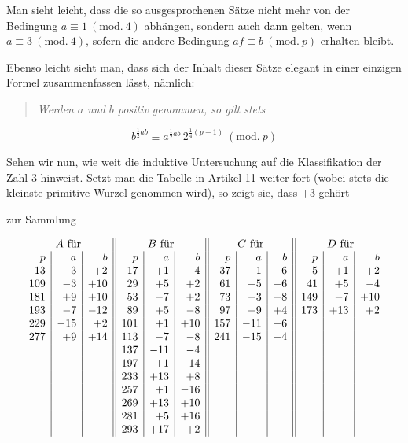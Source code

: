 Man sieht leicht, dass die so ausgesprochenen Sätze nicht mehr von der Bedingung $a\equiv1\ (\mathrm{mod.}\ 4)$ abhängen, sondern auch dann gelten, wenn $a\equiv3\ (\mathrm{mod.}\ 4)$, sofern die andere Bedingung $af\equiv b\ (\mathrm{mod.}\ p)$ erhalten bleibt.

Ebenso leicht sieht man, dass sich der Inhalt dieser Sätze elegant in einer einzigen Formel zusammenfassen lässt, nämlich:
\begin{quote}\itshape Werden $a$ und $b$ positiv genommen, so gilt stets\end{quote}
\[
b^{\frac12ab}\equiv a^{\frac12ab}\,2^{\frac14(p-1)}\ (\mathrm{mod.}\ p)
\]

Sehen wir nun, wie weit die induktive Untersuchung auf die Klassifikation der Zahl $3$ hinweist. Setzt man die Tabelle in Artikel 11 weiter fort (wobei stets die kleinste primitive Wurzel genommen wird), so zeigt sie, dass $+3$ gehört
\begin{center}zur Sammlung\end{center}
\[
\begin{array}{r|r|r||r|r|r||r|r|r||r|r|r}
\multicolumn{3}{c||}{A\ \text{für}}&\multicolumn{3}{c||}{B\ \text{für}}&\multicolumn{3}{c||}{C\ \text{für}}&\multicolumn{3}{c}{D\ \text{für}}\\
p&a&b&p&a&b&p&a&b&p&a&b\\
13&-3&+2&17&+1&-4&37&+1&-6&5&+1&+2\\
109&-3&+10&29&+5&+2&61&+5&-6&41&+5&-4\\
181&+9&+10&53&-7&+2&73&-3&-8&149&-7&+10\\
193&-7&-12&89&+5&-8&97&+9&+4&173&+13&+2\\
229&-15&+2&101&+1&+10&157&-11&-6&&&\\
277&+9&+14&113&-7&-8&241&-15&-4&&&\\
&&&137&-11&-4&&&&&&\\
&&&197&+1&-14&&&&&&\\
&&&233&+13&+8&&&&&&\\
&&&257&+1&-16&&&&&&\\
&&&269&+13&+10&&&&&&\\
&&&281&+5&+16&&&&&&\\
&&&293&+17&+2&&&&&&
\end{array}
\]

